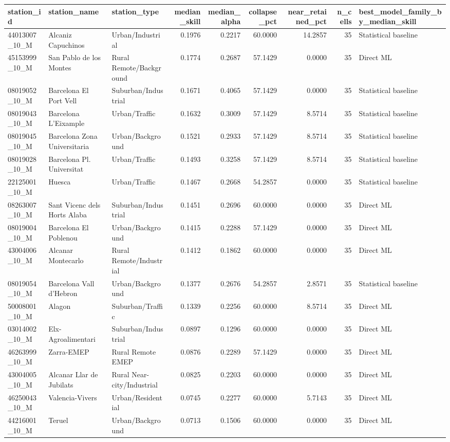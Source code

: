 \begin{tabular}{lllrrrrrl}
\toprule
station\_id & station\_name & station\_type & median\_skill & median\_alpha & collapse\_pct & near\_retained\_pct & n\_cells & best\_model\_family\_by\_median\_skill \\
\midrule
44013007\_10\_M & Alcaniz Capuchinos & Urban/Industrial & 0.1976 & 0.2217 & 60.0000 & 14.2857 & 35 & Statistical baseline \\
45153999\_10\_M & San Pablo de los Montes & Rural Remote/Background & 0.1774 & 0.2687 & 57.1429 & 0.0000 & 35 & Direct ML \\
08019052\_10\_M & Barcelona El Port Vell & Suburban/Industrial & 0.1671 & 0.4065 & 57.1429 & 0.0000 & 35 & Statistical baseline \\
08019043\_10\_M & Barcelona L'Eixample & Urban/Traffic & 0.1632 & 0.3009 & 57.1429 & 8.5714 & 35 & Statistical baseline \\
08019045\_10\_M & Barcelona Zona Universitaria & Urban/Background & 0.1521 & 0.2933 & 57.1429 & 8.5714 & 35 & Statistical baseline \\
08019028\_10\_M & Barcelona Pl. Universitat & Urban/Traffic & 0.1493 & 0.3258 & 57.1429 & 8.5714 & 35 & Statistical baseline \\
22125001\_10\_M & Huesca & Urban/Traffic & 0.1467 & 0.2668 & 54.2857 & 0.0000 & 35 & Statistical baseline \\
08263007\_10\_M & Sant Vicenc dels Horts Alaba & Suburban/Industrial & 0.1451 & 0.2696 & 60.0000 & 0.0000 & 35 & Direct ML \\
08019004\_10\_M & Barcelona El Poblenou & Urban/Background & 0.1415 & 0.2288 & 57.1429 & 0.0000 & 35 & Direct ML \\
43004006\_10\_M & Alcanar Montecarlo & Rural Remote/Industrial & 0.1412 & 0.1862 & 60.0000 & 0.0000 & 35 & Direct ML \\
08019054\_10\_M & Barcelona Vall d'Hebron & Urban/Background & 0.1377 & 0.2676 & 54.2857 & 2.8571 & 35 & Statistical baseline \\
50008001\_10\_M & Alagon & Suburban/Traffic & 0.1339 & 0.2256 & 60.0000 & 8.5714 & 35 & Direct ML \\
03014002\_10\_M & Elx-Agroalimentari & Suburban/Industrial & 0.0897 & 0.1296 & 60.0000 & 0.0000 & 35 & Direct ML \\
46263999\_10\_M & Zarra-EMEP & Rural Remote EMEP & 0.0876 & 0.2289 & 57.1429 & 0.0000 & 35 & Direct ML \\
43004005\_10\_M & Alcanar Llar de Jubilats & Rural Near-city/Industrial & 0.0825 & 0.2203 & 60.0000 & 0.0000 & 35 & Direct ML \\
46250043\_10\_M & Valencia-Vivers & Urban/Residential & 0.0745 & 0.2277 & 60.0000 & 5.7143 & 35 & Direct ML \\
44216001\_10\_M & Teruel & Urban/Background & 0.0713 & 0.1506 & 60.0000 & 0.0000 & 35 & Direct ML \\
\bottomrule
\end{tabular}

